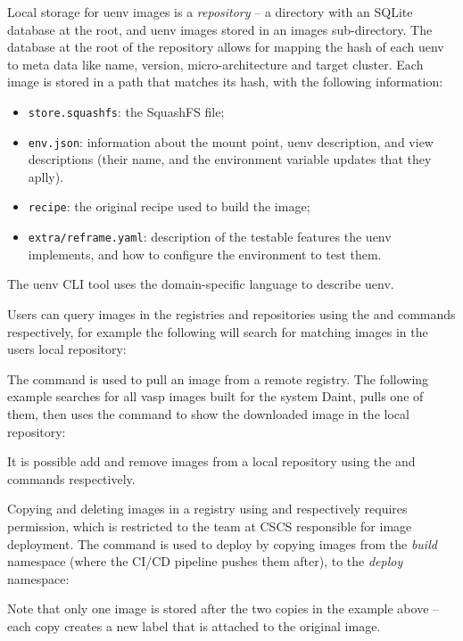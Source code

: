 Local storage for uenv images is a \emph{repository} -- a directory with an SQLite database at the root, and uenv images stored in an images sub-directory.
The database  at the root of the repository allows for mapping the hash of each uenv to meta data like name, version, micro-architecture and target cluster.
Each image is stored in a path that matches its hash, with the following information:
\begin{itemize}
\item  \lstinline{store.squashfs}: the SquashFS file;
\item  \lstinline{env.json}: information about the mount point, uenv description, and view descriptions (their name, and the environment variable updates that they aplly).
\item  \lstinline{recipe}: the original recipe used to build the image;
\item  \lstinline{extra/reframe.yaml}: description of the testable features the uenv implements, and how to configure the environment to test them.
\end{itemize}

The uenv CLI tool uses the domain-specific language  to describe uenv.

Users can query images in the registries and repositories using the  and  commands respectively, for example the following will search for matching images in the users local repository:


The  command is used to pull an image from a remote registry.
The following example searches for all vasp images built for the system Daint, pulls one of them, then uses the  command to show the downloaded image in the local repository:


It is possible add and remove images from a local repository using the  and  commands respectively.

Copying and deleting images in a registry using  and  respectively requires permission, which is restricted to the team at CSCS responsible for image deployment.
The  command is used to deploy by copying images from the \emph{build} namespace (where the CI/CD pipeline pushes them after), to the \emph{deploy} namespace:

Note that only one \squashfs image is stored after the two copies in the example above -- each copy creates a new label that is attached to the original \squashfs image.

